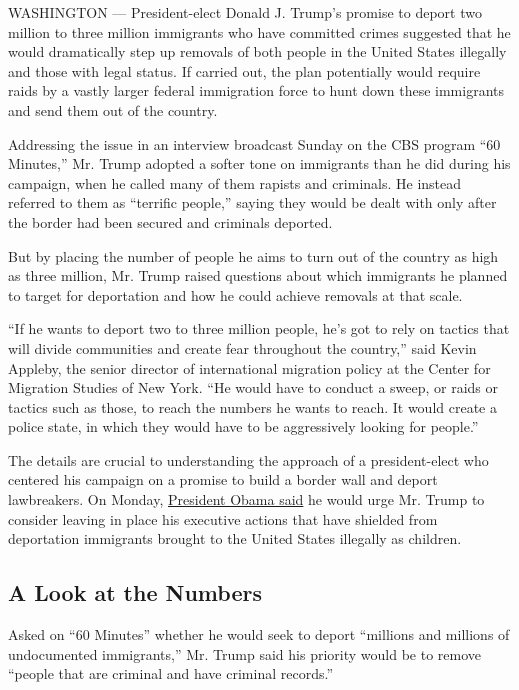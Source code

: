 WASHINGTON --- President-elect Donald J. Trump's promise to deport two
million to three million immigrants who have committed crimes suggested
that he would dramatically step up removals of both people in the United
States illegally and those with legal status. If carried out, the plan
potentially would require raids by a vastly larger federal immigration
force to hunt down these immigrants and send them out of the country.

Addressing the issue in an interview broadcast Sunday on the CBS program
``60 Minutes,'' Mr. Trump adopted a softer tone on immigrants than he
did during his campaign, when he called many of them rapists and
criminals. He instead referred to them as ``terrific people,'' saying
they would be dealt with only after the border had been secured and
criminals deported.

But by placing the number of people he aims to turn out of the country
as high as three million, Mr. Trump raised questions about which
immigrants he planned to target for deportation and how he could achieve
removals at that scale.

``If he wants to deport two to three million people, he's got to rely on
tactics that will divide communities and create fear throughout the
country,'' said Kevin Appleby, the senior director of international
migration policy at the Center for Migration Studies of New York. ``He
would have to conduct a sweep, or raids or tactics such as those, to
reach the numbers he wants to reach. It would create a police state, in
which they would have to be aggressively looking for people.''

The details are crucial to understanding the approach of a
president-elect who centered his campaign on a promise to build a border
wall and deport lawbreakers. On Monday,
\href{http://www.nytimes3xbfgragh.onion/2016/11/14/us/politics/barack-obama-trump.html}{President
Obama said} he would urge Mr. Trump to consider leaving in place his
executive actions that have shielded from deportation immigrants brought
to the United States illegally as children.

\hypertarget{a-look-at-the-numbers}{%
\subsection{A Look at the Numbers}\label{a-look-at-the-numbers}}

Asked on ``60 Minutes'' whether he would seek to deport ``millions and
millions of undocumented immigrants,'' Mr. Trump said his priority would
be to remove ``people that are criminal and have criminal records.''

